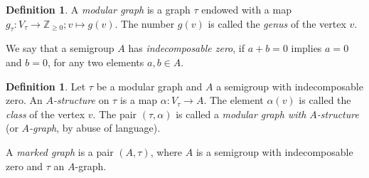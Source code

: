 \documentclass[11pt]{amsart}
\theoremstyle{definition}
\newtheorem{defn}[prop]{Definition}
\theoremstyle{remark}
\newcommand{\zz}{{\mathbb{Z}}}
\renewcommand{\t}{_{\tau}}
\theoremstyle{plain}
\theoremstyle{definition}
\theoremstyle{remark}
\begin{document}
\begin{defn} \label{domg}
A {\em modular graph } is a graph \(\tau\) endowed with a map
\(g\t:V\t\rightarrow\zz_{\geq0};v\mapsto g(v)\). The number
\(g(v)\) is called the {\em genus }of the vertex \(v\).
\end{defn}

We say that a semigroup \(A\) has {\em indecomposable zero}, if \(a+b=0\) implies
\(a=0\) and \(b=0\), for any two elements
\(a,b\in A\).

\begin{defn} \label{doasmg}
Let \(\tau\) be a modular graph and \(A\) a semigroup with indecomposable zero. An
{\em \(A\)-structure } on \(\tau\) is a map
\(\alpha:V_{\tau}\rightarrow A\). The element \(\alpha(v)\) is called the {\em
class } of the vertex \(v\). The pair
\((\tau,\alpha)\) is called a {\em modular graph with \(A\)-structure }(or {\em
\(A\)-graph}, by abuse of language).

A {\em marked graph } is a pair \((A,\tau)\), where \(A\) is a semigroup with
indecomposable zero and \(\tau\) an \(A\)-graph.
\end{defn}
\end{document}
